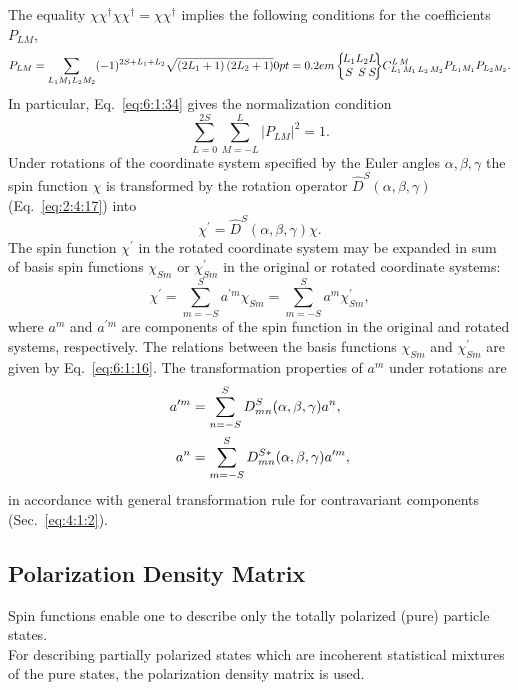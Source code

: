 The equality $\chi \chi^{\dagger} \chi \chi^{\dagger}=\chi \chi^{\dagger}$ implies the following conditions for the coefficients $P_{L M}$,
\begin{equation}
P_{L M}=\sum_{L_{1} M_{1} L_{2} M_{2}}(-1)^{2 S+L_{1}+L_{2}} \sqrt{\left(2 L_{1}+1\right)\left(2 L_{2}+1\right)}\sixj{L_{1}}{L_{2}}{L}{S}{S}{S} \clebsch{L_{1}}{M_{1}}{L_{2}}{M_{2}}{L}{M} P_{L_{1} M_{1}} P_{L_{2} M_{2}}. \label{eq:6:1:34}
\end{equation}
In particular, Eq.~\eqref{eq:6:1:34} gives the normalization condition
\begin{equation}
\sum_{L=0}^{2 S} \sum_{M=-L}^{L}\left|P_{L M}\right|^{2}=1. \label{eq:6:1:35}
\end{equation}
Under rotations of the coordinate system specified by the Euler angles $\alpha, \beta, \gamma$ the spin function $\chi$ is transformed by the rotation operator $\widehat{D}^{S}(\alpha, \beta, \gamma)$ (Eq.~\eqref{eq:2:4:17}) into
\begin{equation}
\chi^{\prime}=\widehat{D}^{S}(\alpha, \beta, \gamma) \chi. \label{eq:6:1:36}
\end{equation}
The spin function $\chi^{\prime}$ in the rotated coordinate system may be expanded in sum of basis spin functions $\chi_{S m}$ or $\chi_{S m}^{\prime}$ in the original or rotated coordinate systems:
\begin{equation}
\chi^{\prime}=\sum_{m=-S}^{S} a^{\prime m} \chi_{S m}=\sum_{m=-S}^{S} a^{m} \chi_{S m}^{\prime}, \label{eq:6:1:37}
\end{equation}
where $a^{m}$ and $a^{\prime m}$ are components of the spin function in the original and rotated systems, respectively. The relations between the basis functions $\chi_{S m}$ and $\chi_{S m}^{\prime}$ are given by Eq.~\eqref{eq:6:1:16}. The transformation properties of $a^{m}$ under rotations are
\begin{align}
a^{\prime m} & =\sum_{n=-S}^{S} D_{m n}^{S}(\alpha, \beta, \gamma) a^{n}, \label{eq:6:1:38}\\
a^{n} & =\sum_{m=-S}^{S} D_{m n}^{S *}(\alpha, \beta, \gamma) a^{\prime m}, \notag
\end{align}
in accordance with general transformation rule for contravariant components (Sec.~\ref{eq:4:1:2}).

\subsection{Polarization Density Matrix}\label{sec:6.1.5}
Spin functions enable one to describe only the totally polarized (pure) particle states.\\
For describing partially polarized states which are incoherent statistical mixtures of the pure states, the polarization density matrix is used.

